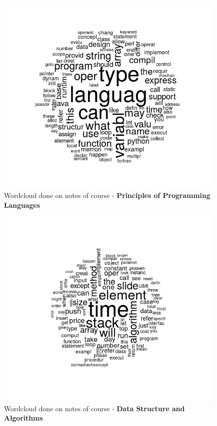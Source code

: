 \documentclass[conference]{IEEEtran}
\begin{document}
\iffalse
\begin{figure}
	\includegraphics[width=\linewidth]{ppl.png}
	\caption{Wordcloud done on notes of course - \textbf{Principles of Programming Languages}}
	\label{fig:ppl}
\end{figure}
\begin{figure}
	\includegraphics[width=\linewidth]{ds.png}
	\caption{Wordcloud done on notes of course -\textbf{ Data Structure and Algorithms} }
	\label{fig:ds}
\end{figure}
\end{document}
